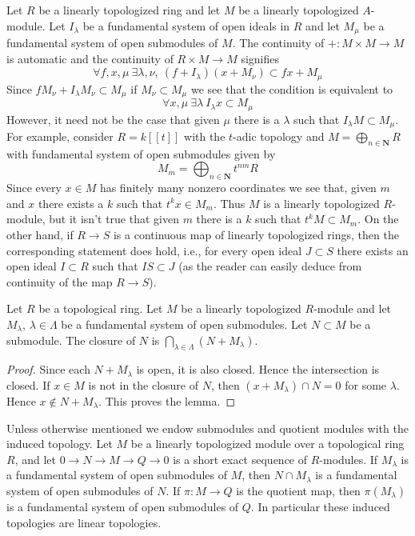 \begin{example}
\label{example-what-does-it-mean}
Let $R$ be a linearly topologized ring and let $M$ be a linearly
topologized $A$-module. Let $I_\lambda$ be a fundamental system of
open ideals in $R$ and let $M_\mu$ be a fundamental system of
open submodules of $M$. The continuity of $+ : M \times M \to M$
is automatic and the continuity of $R \times M \to M$ signifies
$$
\forall f, x, \mu\ \exists \lambda, \nu,\ (f + I_\lambda)(x + M_\nu)
\subset fx + M_\mu
$$
Since $fM_\nu + I_\lambda M_\nu \subset M_\mu$ if
$M_\nu \subset M_\mu$ we see that the condition is equivalent to
$$
\forall x, \mu\ \exists \lambda\ I_\lambda x \subset M_\mu
$$
However, it need not be the case that given $\mu$ there is a $\lambda$
such that $I_\lambda M \subset M_\mu$. For example, consider
$R = k[[t]]$ with the $t$-adic topology and
$M = \bigoplus_{n \in \mathbf{N}} R$ with fundamental system of
open submodules given by
$$
M_m = \bigoplus\nolimits_{n \in \mathbf{N}} t^{nm}R
$$
Since every $x \in M$ has finitely many nonzero coordinates we see
that, given $m$ and $x$ there exists a $k$ such that $t^k x \in M_m$.
Thus $M$ is a linearly topologized $R$-module, but it isn't true
that given $m$ there is a $k$ such that $t^kM \subset M_m$.
On the other hand, if $R \to S$ is a continuous map of linearly
topologized rings, then the corresponding statement does hold, i.e.,
for every open ideal $J \subset S$ there exists an open ideal
$I \subset R$ such that $IS \subset J$ (as the reader can easily
deduce from continuity of the map $R \to S$).
\end{example}





\begin{lemma}
\label{lemma-closed}
Let $R$ be a topological ring. Let $M$ be a linearly topologized
$R$-module and let $M_\lambda$, $\lambda \in \Lambda$ be a fundamental
system of open submodules. Let $N \subset M$ be a submodule.
The closure of $N$ is $\bigcap_{\lambda \in \Lambda} (N + M_\lambda)$.
\end{lemma}

\begin{proof}
Since each $N + M_\lambda$ is open, it is also closed. Hence the
intersection is closed. If $x \in M$ is not in the closure of $N$,
then $(x + M_\lambda) \cap N = 0$ for some $\lambda$. Hence
$x \not \in N + M_\lambda$. This proves the lemma.
\end{proof}

\noindent
Unless otherwise mentioned we endow submodules and quotient modules
with the induced topology. Let $M$ be a linearly topologized module
over a topological ring $R$, and let $0 \to N \to M \to Q \to 0$
is a short exact sequence of $R$-modules. If $M_\lambda$ is a
fundamental system of open submodules of $M$, then
$N \cap M_\lambda$ is a fundamental system of open submodules of $N$.
If $\pi : M \to Q$ is the quotient map, then $\pi(M_\lambda)$ is a
fundamental system of open submodules of $Q$. In particular these induced
topologies are linear topologies.

